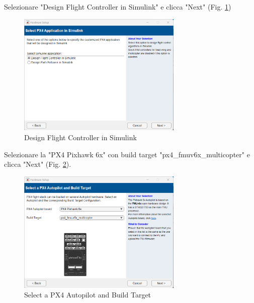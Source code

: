 \noindent
Selezionare "Design Flight Controller in Simulink" e clicca "Next" (Fig. \ref{fig:Design Flight Controller in Simulink}) 
\begin{figure}[H] %
  \centering
  \includegraphics[width=0.7\textwidth]{files/images/matlab7.png} %
  \caption{Design Flight Controller in Simulink} %
  \label{fig:Design Flight Controller in Simulink} %
\end{figure}
\noindent
Selezionare la "PX4 Pixhawk 6x" con build target "px4\_fmu\-v6x\_multicopter" e clicca "Next" (Fig. \ref{fig:Select a PX4 Autopilot and Build Target}).
\begin{figure}[H] %
  \centering
  \includegraphics[width=0.7\textwidth]{files/images/matlab8.png} %
  \caption{Select a PX4 Autopilot and Build Target} %
  \label{fig:Select a PX4 Autopilot and Build Target} %
\end{figure}
